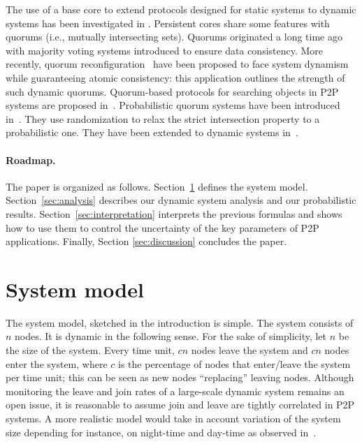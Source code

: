 \documentclass[]{llncs}
\begin{document}
The use of a base core to extend protocols designed for static systems to 
dynamic systems has been investigated in \cite{MRT05}. 
Persistent cores share some features with quorums (i.e., mutually 
intersecting sets). Quorums originated a  long time 
ago  with   majority   voting  systems \cite{G79,T79}  introduced to ensure
data   consistency.   
More recently, quorum reconfiguration~\cite{LS02,CGGMS05} have been proposed to face system dynamism while 
guaranteeing atomic consistency: this application outlines the strength of
such dynamic quorums.
Quorum-based  protocols for searching  objects in  P2P
systems  are proposed in~\cite{MTK06}.  Probabilistic  quorum  systems  
have been introduced in~\cite{MRWW01}.  They use randomization to
relax the strict intersection property to a probabilistic one.  They have
been extended to dynamic systems in~\cite{AM05}. 


\paragraph{Roadmap.}
The paper is organized as follows. 
Section~\ref{sec:model}
defines the system model. Section~\ref{sec:analysis} describes
our dynamic system analysis and our probabilistic results. 
Section~\ref{sec:interpretation} interprets the
previous formulas and shows how to use them  to  control
the uncertainty of the key parameters of P2P applications.  
Finally, Section \ref{sec:discussion} concludes the paper. 


\section{System model}
\label{sec:model}
The system model, sketched in the introduction is simple. 
The system consists of $n$ nodes. It is dynamic in the following sense. 
For the sake of simplicity, let $n$ be the size of the system.
Every time unit, $cn$  nodes leave the system and $cn$ 
nodes enter the system, where $c$ is the percentage of nodes that enter/leave
the system per time unit; this  can be seen as  new nodes ``replacing''
leaving nodes.  Although monitoring the leave and join rates of a large-scale 
dynamic system remains an open issue, it is reasonable to assume join and leave
are tightly correlated in P2P systems. 
A more realistic model would take in account variation of the system size 
depending for instance, on night-time and day-time as observed in~\cite{SGG02}.
\end{document}
